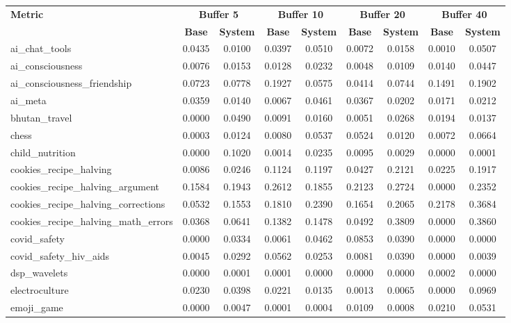 \documentclass[pdflatex,sn-mathphys-num]{sn-jnl}%
\theoremstyle{thmstyleone}%
\theoremstyle{thmstyletwo}%
\theoremstyle{thmstylethree}%
\begin{document}
\begin{appendices}
\begin{landscape}
\begin{longtable}{@{}p{3.8cm}cccccccc@{}}
\toprule
\textbf{Metric} & \multicolumn{2}{c}{\textbf{Buffer 5}} & \multicolumn{2}{c}{\textbf{Buffer 10}} & \multicolumn{2}{c}{\textbf{Buffer 20}} & \multicolumn{2}{c}{\textbf{Buffer 40}} \\
\cmidrule(lr){2-3}\cmidrule(lr){4-5}\cmidrule(lr){6-7}\cmidrule(lr){8-9}
 & \textbf{Base} & \textbf{System} & \textbf{Base} & \textbf{System} & \textbf{Base} & \textbf{System} & \textbf{Base} & \textbf{System} \\
\midrule
\endhead
ai\_chat\_tools & 0.0435 & 0.0100 & 0.0397 & 0.0510 & 0.0072 & 0.0158 & 0.0010 & 0.0507 \\
ai\_consciousness & 0.0076 & 0.0153 & 0.0128 & 0.0232 & 0.0048 & 0.0109 & 0.0140 & 0.0447 \\
ai\_consciousness\_friendship & 0.0723 & 0.0778 & 0.1927 & 0.0575 & 0.0414 & 0.0744 & 0.1491 & 0.1902 \\
ai\_meta & 0.0359 & 0.0140 & 0.0067 & 0.0461 & 0.0367 & 0.0202 & 0.0171 & 0.0212 \\
bhutan\_travel & 0.0000 & 0.0490 & 0.0091 & 0.0160 & 0.0051 & 0.0268 & 0.0194 & 0.0137 \\
chess & 0.0003 & 0.0124 & 0.0080 & 0.0537 & 0.0524 & 0.0120 & 0.0072 & 0.0664 \\
child\_nutrition & 0.0000 & 0.1020 & 0.0014 & 0.0235 & 0.0095 & 0.0029 & 0.0000 & 0.0001 \\
cookies\_recipe\_halving & 0.0086 & 0.0246 & 0.1124 & 0.1197 & 0.0427 & 0.2121 & 0.0225 & 0.1917 \\
cookies\_recipe\_halving\_argument & 0.1584 & 0.1943 & 0.2612 & 0.1855 & 0.2123 & 0.2724 & 0.0000 & 0.2352 \\
cookies\_recipe\_halving\_corrections & 0.0532 & 0.1553 & 0.1810 & 0.2390 & 0.1654 & 0.2065 & 0.2178 & 0.3684 \\
cookies\_recipe\_halving\_math\_errors & 0.0368 & 0.0641 & 0.1382 & 0.1478 & 0.0492 & 0.3809 & 0.0000 & 0.3860 \\
covid\_safety & 0.0000 & 0.0334 & 0.0061 & 0.0462 & 0.0853 & 0.0390 & 0.0000 & 0.0000 \\
covid\_safety\_hiv\_aids & 0.0045 & 0.0292 & 0.0562 & 0.0253 & 0.0081 & 0.0390 & 0.0000 & 0.0039 \\
dsp\_wavelets & 0.0000 & 0.0001 & 0.0001 & 0.0000 & 0.0000 & 0.0000 & 0.0002 & 0.0000 \\
electroculture & 0.0230 & 0.0398 & 0.0221 & 0.0135 & 0.0013 & 0.0065 & 0.0000 & 0.0969 \\
emoji\_game & 0.0000 & 0.0047 & 0.0001 & 0.0004 & 0.0109 & 0.0008 & 0.0210 & 0.0531 \\

\end{longtable}
\end{landscape}
\end{appendices}
\end{document}
